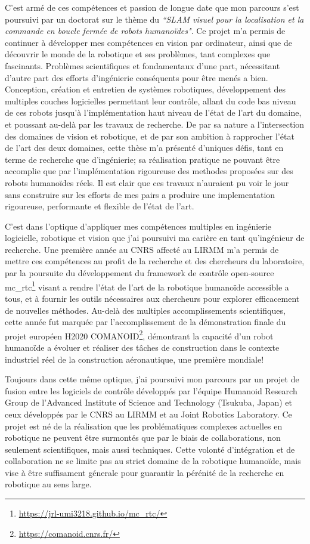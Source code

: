 \documentclass[11pt, a4paper]{awesome-cv}
\begin{document}
\begin{cvletter}
  C'est armé de ces compétences et passion de longue date que mon parcours s'est poursuivi par un doctorat sur le thème du \emph{``SLAM visuel pour la localisation et la commande en boucle fermée de robots humanoïdes"}. Ce projet m'a permis de continuer à développer mes compétences en vision par ordinateur, ainsi que de découvrir le monde de la robotique et ses problèmes, tant complexes que fascinants. Problèmes scientifiques et fondamentaux d'une part, nécessitant d'autre part des efforts d'ingénierie conséquents pour être menés a bien. Conception, création et entretien de systèmes robotiques, développement des multiples couches logicielles permettant leur contrôle, allant du code bas niveau de ces robots jusqu'à l'implémentation haut niveau de l'état de l'art du domaine, et poussant au-delà par les travaux de recherche. De par sa nature a l'intersection des domaines de vision et robotique, et de par son ambition à rapprocher l'état de l'art des deux domaines, cette thèse m'a présenté d'uniques défis, tant en terme de recherche que d'ingénierie; sa réalisation pratique ne pouvant être accomplie que par l'implémentation rigoureuse des methodes proposées sur des robots humanoïdes réels. Il est clair que ces travaux n'auraient pu voir le jour sans construire sur les efforts de mes pairs a produire une implementation rigoureuse, performante et flexible de l'état de l'art.

  C'est dans l'optique d'appliquer mes compétences multiples en ingénierie logicielle, robotique et vision que j'ai poursuivi ma carière en tant qu'ingénieur de recherche. Une première année au CNRS affecté au LIRMM m'a permis de mettre ces compétences au profit de la recherche et des chercheurs du laboratoire, par la poursuite du développement du framework de contrôle open-source mc\_rtc\footnote{\url{https://jrl-umi3218.github.io/mc_rtc/}} visant a rendre l'état de l'art de la robotique humanoïde accessible a tous, et à fournir les outils nécessaires aux chercheurs pour explorer efficacement de nouvelles méthodes. Au-delà des multiples accomplissements scientifiques, cette année fut marquée par l'accomplissement de la démonstration finale du projet européen H2020 COMANOID\footnote{\url{https://comanoid.cnrs.fr/}}, démontrant la capacité d'un robot humanoïde a évoluer et réaliser des tâches de construction dans le contexte industriel réel de la construction aéronautique, une première mondiale!

  Toujours dans cette même optique, j'ai poursuivi mon parcours par un projet de fusion entre les logiciels de contrôle développés par l'équipe Humanoid Research Group de l'Advanced Institute of Science and Technology (Tsukuba, Japan) et ceux développés par le CNRS au LIRMM et au Joint Robotics Laboratory. Ce projet est né de la réalisation que les problématiques complexes actuelles en robotique ne peuvent être surmontés que par le biais de collaborations, non seulement scientifiques, mais aussi techniques. Cette volonté d'intégration et de collaboration ne se limite pas au strict domaine de la robotique humanoïde, mais vise à être suffisament génerale pour guarantir la pérénité de la recherche en robotique au sens large.


\end{cvletter}
\end{document}
